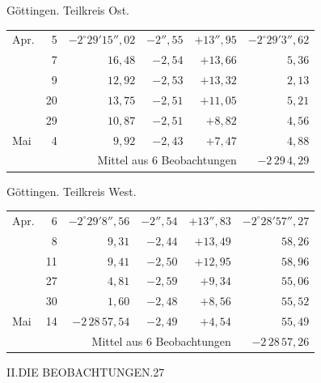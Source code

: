 \noindent\begin{minipage}[t]{.495\textwidth}\centering Göttingen. Teilkreis Ost.\par\smallskip
{\scriptsize\setlength{\tabcolsep}{1pt}\renewcommand{\arraystretch}{1.2}\begin{tabular}{lr|r|r|r|r|}
Apr.&5&$-2^\circ29'15''{,}02$&$-2''{,}55$&$+13''{,}95$&$-2^\circ29'3''{,}62$\\
&7&$16{,}48$&$-2{,}54$&$+13{,}66$&$5{,}36$\\
&9&$12{,}92$&$-2{,}53$&$+13{,}32$&$2{,}13$\\
&20&$13{,}75$&$-2{,}51$&$+11{,}05$&$5{,}21$\\
&29&$10{,}87$&$-2{,}51$&$+8{,}82$&$4{,}56$\\
Mai&4&$9{,}92$&$-2{,}43$&$+7{,}47$&$4{,}88$\\
\cline{6-6}\multicolumn{5}{r}{Mittel aus 6 Beobachtungen}&$-2\,29\,4{,}29$
\end{tabular}}\end{minipage}\hfill\begin{minipage}[t]{.495\textwidth}\centering Göttingen. Teilkreis West.\par\smallskip
{\scriptsize\setlength{\tabcolsep}{1pt}\renewcommand{\arraystretch}{1.2}\begin{tabular}{lr|r|r|r|r}
Apr.&6&$-2^\circ29'8''{,}56$&$-2''{,}54$&$+13''{,}83$&$-2^\circ28'57''{,}27$\\
&8&$9{,}31$&$-2{,}44$&$+13{,}49$&$58{,}26$\\
&11&$9{,}41$&$-2{,}50$&$+12{,}95$&$58{,}96$\\
&27&$4{,}81$&$-2{,}59$&$+9{,}34$&$55{,}06$\\
&30&$1{,}60$&$-2{,}48$&$+8{,}56$&$55{,}52$\\
Mai&14&$-2\,28\,57{,}54$&$-2{,}49$&$+4{,}54$&$55{,}49$\\
\cline{6-6}\multicolumn{5}{r}{Mittel aus 6 Beobachtungen}&$-2\,28\,57{,}26$
\end{tabular}}\end{minipage}
\par\vspace{4mm}

\clearpage
\noindent\mbox{}\hfill II.\quad DIE BEOBACHTUNGEN.\hfill 27\par

